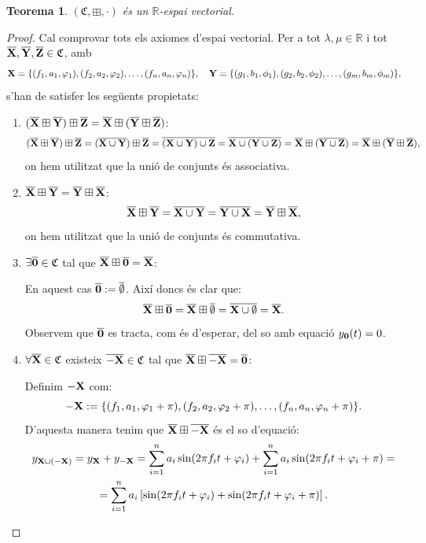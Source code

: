 \documentclass{article}
\theoremstyle{math}
\newtheorem{theorem}[definition]{Teorema}
\newcommand{\0}{\ensuremath{\vb{0}}}
\newcommand{\X}{\ensuremath{\vb{X}}}
\newcommand{\Y}{\ensuremath{\vb{Y}}}
\newcommand{\Z}{\ensuremath{\vb{Z}}}
\newcommand{\RR}{\ensuremath{\mathbb{R}}} %
\begin{document}
\begin{theorem}
    $(\mathfrak{C},\boxplus,\cdot)$ és un $\RR$-espai vectorial.
\end{theorem}
\begin{proof}
    Cal comprovar tots els axiomes d'espai vectorial. Per a tot $\lambda,\mu\in\RR$ i tot $\overline{\X},\overline{\Y},\overline{\Z}\in\mathfrak{C}$, amb $$\X=\{(f_1,a_1,\varphi_1),(f_2,a_2,\varphi_2),\ldots,(f_n,a_n,\varphi_n)\},\quad\Y=\{(g_1,b_1,\phi_1),(g_2,b_2,\phi_2),\ldots,(g_m,b_m,\phi_m)\},$$  s'han de satisfer les següents propietats:
    \begin{enumerate}
        \item $(\overline{\X}\boxplus \overline{\Y})\boxplus \overline{\Z}=\overline{\X}\boxplus (\overline{\Y}\boxplus \overline{\Z})$:
        $$(\overline{\X}\boxplus \overline{\Y})\boxplus \overline{\Z}=(\overline{\X\cup\Y})\boxplus \overline{\Z}=\overline{(\X\cup\Y)\cup\Z}=\overline{\X\cup(\Y\cup\Z)}=\overline{\X}\boxplus(\overline{\Y\cup\Z})=\overline{\X}\boxplus (\overline{\Y}\boxplus \overline{\Z}),$$ on hem utilitzat que la unió de conjunts és associativa.
        \item $\overline{\X}\boxplus \overline{\Y}=\overline{\Y}\boxplus \overline{\X}$:
        $$\overline{\X}\boxplus \overline{\Y}=\overline{\X\cup\Y}=\overline{\Y\cup\X}=\overline{\Y}\boxplus \overline{\X},$$ on hem utilitzat que la unió de conjunts és commutativa.
        \item $\exists \overline{\0}\in\mathfrak{C}$ tal que $\overline{\X}\boxplus\overline{\0}=\overline{\X}$:\par
        En aquest cas $\overline{\0}:=\overline{\emptyset}$. Així doncs és clar que: $$\overline{\X}\boxplus\overline{\0}=\overline{\X}\boxplus\overline{\emptyset}=\overline{\X\cup\emptyset}=\overline{\X}.$$ Observem que $\overline{\0}$ es tracta, com és d'esperar, del so amb equació $y_{\0}(t)=0$.
        \item $\forall \overline{\X}\in\mathfrak{C}$ existeix $\overline{-\X}\in\mathfrak{C}$ tal que $\overline{\X}\boxplus\overline{-\X}=\overline{\0}$:\par
        Definim $-\X$ com: $$-\X:=\{(f_1,a_1,\varphi_1+\pi),(f_2,a_2,\varphi_2+\pi),\ldots,(f_n,a_n,\varphi_n+\pi)\}.$$ D'aquesta manera tenim que $\overline{\X}\boxplus\overline{-\X}$ és el so d'equació:
        \begin{multline*}
            y_{\X\cup(-\X)}=y_{\X}+y_{-\X}=\sum_{i=1}^na_i\sin(2\pi f_it+\varphi_i)+\sum_{i=1}^na_i\sin(2\pi f_it+\varphi_i+\pi)=\\=\sum_{i=1}^na_i\left[\sin(2\pi f_it+\varphi_i)+\sin(2\pi f_it+\varphi_i+\pi)\right].

\end{multline*}
\end{enumerate}
\end{proof}
\end{document}
